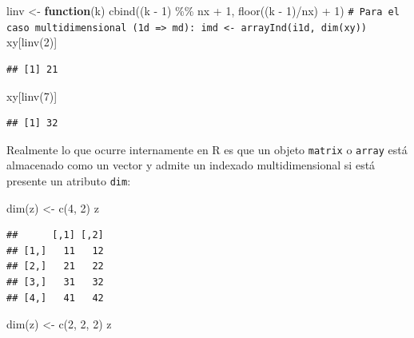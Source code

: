 \documentclass[
]{book}
\newenvironment{Shaded}{\begin{snugshade}}{\end{snugshade}}
\newcommand{\CommentTok}[1]{\textcolor[rgb]{0.56,0.35,0.01}{\textit{#1}}}
\newcommand{\ControlFlowTok}[1]{\textcolor[rgb]{0.13,0.29,0.53}{\textbf{#1}}}
\newcommand{\DecValTok}[1]{\textcolor[rgb]{0.00,0.00,0.81}{#1}}
\newcommand{\FunctionTok}[1]{\textcolor[rgb]{0.00,0.00,0.00}{#1}}
\newcommand{\NormalTok}[1]{#1}
\newcommand{\OtherTok}[1]{\textcolor[rgb]{0.56,0.35,0.01}{#1}}
\newcommand{\SpecialCharTok}[1]{\textcolor[rgb]{0.00,0.00,0.00}{#1}}
\theoremstyle{break}
\theoremstyle{nonumberplain}
\renewcommand{\CommentTok}[1]{\textcolor[rgb]{0.41,0.41,0.41}{\texttt{#1}}}
\begin{document}
\begin{Shaded}
\begin{Highlighting}[]
\NormalTok{linv }\OtherTok{\textless{}{-}} \ControlFlowTok{function}\NormalTok{(k) }\FunctionTok{cbind}\NormalTok{((k }\SpecialCharTok{{-}} \DecValTok{1}\NormalTok{) }\SpecialCharTok{\%\%}\NormalTok{ nx }\SpecialCharTok{+} \DecValTok{1}\NormalTok{, }\FunctionTok{floor}\NormalTok{((k }\SpecialCharTok{{-}} \DecValTok{1}\NormalTok{)}\SpecialCharTok{/}\NormalTok{nx) }\SpecialCharTok{+} \DecValTok{1}\NormalTok{)}
\CommentTok{\# Para el caso multidimensional (1d =\textgreater{} md): imd \textless{}{-} arrayInd(i1d, dim(xy))}
\NormalTok{xy[}\FunctionTok{linv}\NormalTok{(}\DecValTok{2}\NormalTok{)]}
\end{Highlighting}
\end{Shaded}

\begin{verbatim}
## [1] 21
\end{verbatim}

\begin{Shaded}
\begin{Highlighting}[]
\NormalTok{xy[}\FunctionTok{linv}\NormalTok{(}\DecValTok{7}\NormalTok{)]}
\end{Highlighting}
\end{Shaded}

\begin{verbatim}
## [1] 32
\end{verbatim}

Realmente lo que ocurre internamente en R es que un objeto \texttt{matrix} o \texttt{array} está almacenado como un vector y admite un indexado multidimensional si está presente un atributo \texttt{dim}:

\begin{Shaded}
\begin{Highlighting}[]
\FunctionTok{dim}\NormalTok{(z) }\OtherTok{\textless{}{-}} \FunctionTok{c}\NormalTok{(}\DecValTok{4}\NormalTok{, }\DecValTok{2}\NormalTok{)}
\NormalTok{z}
\end{Highlighting}
\end{Shaded}

\begin{verbatim}
##      [,1] [,2]
## [1,]   11   12
## [2,]   21   22
## [3,]   31   32
## [4,]   41   42
\end{verbatim}

\begin{Shaded}
\begin{Highlighting}[]
\FunctionTok{dim}\NormalTok{(z) }\OtherTok{\textless{}{-}} \FunctionTok{c}\NormalTok{(}\DecValTok{2}\NormalTok{, }\DecValTok{2}\NormalTok{, }\DecValTok{2}\NormalTok{)}
\NormalTok{z}
\end{Highlighting}
\end{Shaded}
\end{document}
